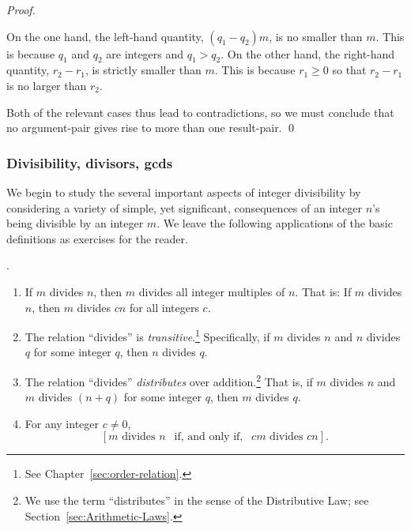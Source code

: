 \begin{proof}
\begin{itemize}
\smallskip

On the one hand, the left-hand quantity, $(q_1 - q_2) m$, is no smaller than $m$.  This is because $q_1$ and $q_2$ are integers and $q_1 > q_2$.  On the other hand, the right-hand quantity, $r_2 - r_1$, is strictly smaller than $m$.  This is because $r_1 \geq 0$ so that $r_2 - r_1$ is no larger than $r_2$.
\end{itemize}
Both of the relevant cases thus lead to contradictions, so we must conclude that no argument-pair gives rise to more than one result-pair.  \qed
\end{proof}


\subsubsection{Divisibility, divisors, {\sc gcd}s}
\label{sec:divisibility+GCD}

We begin to study the several important aspects of integer divisibility by considering a variety of simple, yet significant, consequences of an integer $n$'s being divisible by an integer $m$.  We leave the following applications of the basic definitions as exercises for the reader.

\begin{prop}.
\label{thm:basic-divisibility}
\begin{enumerate}
\item
If $m$ divides $n$, then $m$ divides all integer multiples of $n$. That is: If $m$ divides $n$, then $m$ divides $cn$ for all integers $c$.

\medskip\item
The relation ``divides'' is {\em transitive}.\footnote{See Chapter~\ref{sec:order-relation}.}  Specifically, if $m$ divides $n$ and $n$ divides $q$ for some integer $q$, then $n$ divides $q$.

\medskip\item
The relation ``divides'' {\em distributes} over addition.\footnote{We use the term ``distributes'' in the sense of the Distributive Law; see Section~\ref{sec:Arithmetic-Laws}.}  That is, if $m$ divides $n$ and $m$ divides $(n+q)$ for some integer $q$, then $m$ divides $q$.

\medskip\item 
For any integer $c \neq 0$,
\[ \left[m \mbox{ divides } n \ \ \mbox{ if, and only if, } \ \ cm \mbox{ divides } cn \right]. \]
\end{enumerate}
\end{prop}

